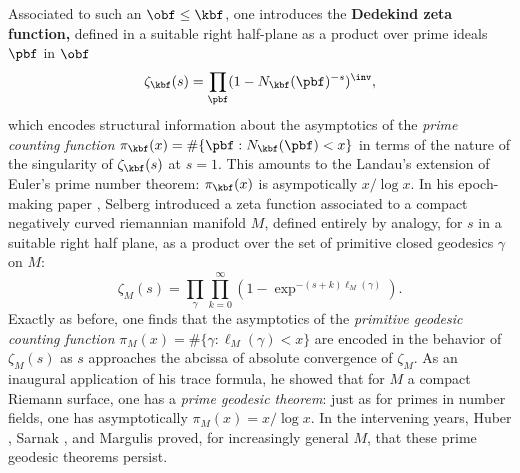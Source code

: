 \documentclass[12pt]{article}
\begin{document}
Associated to such an  $\obf \leq \kbf$, one introduces the {\bf Dedekind zeta function,}  defined in a suitable right half-plane as a product over prime ideals $\pbf$ in $\obf$ 
		\[ \zeta_\kbf (s)  = \prod_{\pbf} 	( 1 - N_\kbf (\pbf)^{-s})^\inv, \]   
which encodes structural information about the asymptotics of the \emph{prime counting function} $ \pi_\kbf (x) = \# \{ \pbf : N_\kbf(\pbf) < x\}$  in terms of the nature of the singularity of $\zeta_\kbf (s)$ at $s=1$. This amounts to the Landau's extension of Euler's prime number theorem:  $\pi_\kbf(x)$ is asympotically $x/\log x$.   In his epoch-making paper \cite{selberg1956harmonic}, Selberg introduced a zeta function associated to a compact negatively curved riemannian manifold $M$, defined entirely by analogy, for $s$ in a suitable right half plane, as a product over the set of primitive closed geodesics $\gamma$ on $M$:
\[	\zeta_M(s) = \prod_{\gamma} \prod_{k=0}^\infty   ( 1 -  \exp^{-(s+k) \ell_M(\gamma) }  ) .\label{szf}\]
Exactly as before, one finds that the asymptotics of the \emph{primitive geodesic counting function} $\pi_M(x) = \# \{ \gamma : \ell_M (\gamma)  < x\}$ are encoded in the behavior of $\zeta_M(s)$ as $s$  approaches the abcissa of absolute convergence of $\zeta_M$.  As an inaugural application of his trace formula, he showed that for $M$ a compact Riemann surface, one has a \emph{prime geodesic theorem}: just as for primes in number fields, one has asymptotically $\pi_M(x) = x / \log x$. In the intervening years, Huber \cite{huber1959}, Sarnak \cite{sarnak1981}, and Margulis \cite{margulis1969} proved, for increasingly general $M$, that these prime geodesic theorems persist. 
 
\end{document}
